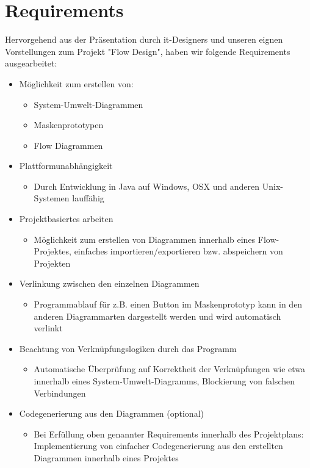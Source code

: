 \section{Requirements}
Hervorgehend aus der Präsentation durch it-Designers und unseren eignen Vorstellungen zum Projekt "Flow Design", haben wir folgende Requirements ausgearbeitet:

\begin{itemize}
	\item Möglichkeit zum erstellen von:
	\begin{itemize}
		\item System-Umwelt-Diagrammen
		\item Maskenprototypen
		\item Flow Diagrammen
	\end{itemize}

	\item Plattformunabhängigkeit
	\begin{itemize}
		\item Durch Entwicklung in Java auf Windows, OSX und anderen Unix-Systemen lauffähig
	\end{itemize}

	\item Projektbasiertes arbeiten
	\begin{itemize}
		\item Möglichkeit zum erstellen von Diagrammen innerhalb eines Flow-Projektes, einfaches importieren/exportieren bzw. abspeichern von Projekten
	\end{itemize}

	\item Verlinkung zwischen den einzelnen Diagrammen 
	\begin{itemize}
		\item Programmablauf für z.B. einen Button im Maskenprototyp kann in den anderen Diagrammarten dargestellt werden und wird automatisch verlinkt 
	\end{itemize}

	\item Beachtung von Verknüpfungslogiken durch das Programm
	\begin{itemize}
		\item Automatische Überprüfung auf Korrektheit der Verknüpfungen wie etwa innerhalb eines System-Umwelt-Diagramms, Blockierung von falschen Verbindungen  
	\end{itemize}

	\item Codegenerierung aus den Diagrammen (optional)
	\begin{itemize}
		\item Bei Erfüllung oben genannter Requirements  innerhalb des Projektplans: Implementierung von einfacher Codegenerierung aus den erstellten Diagrammen innerhalb eines Projektes
	\end{itemize}
\end{itemize} 
